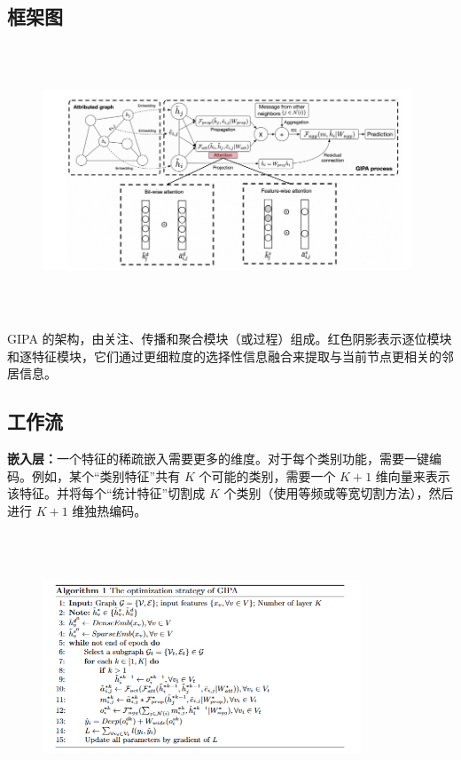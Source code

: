 \documentclass{article}
\begin{document}
\subsection*{框架图}
\begin{figure}[htbp]
    \centering
    \includegraphics[width=11cm, height=8cm]{框架图.png}
\end{figure}
GIPA 的架构，由关注、传播和聚合模块（或过程）组成。红色阴影表示逐位模块和逐特征模块，它们通过更细粒度的选择性信息融合来提取与当前节点更相关的邻居信息。

\subsection*{工作流}
\textbf{嵌入层：}一个特征的稀疏嵌入需要更多的维度。对于每个类别功能，需要一键编码。例如，某个“类别特征”共有 \(K\) 个可能的类别，需要一个 \(K + 1\) 维向量来表示该特征。并将每个“统计特征”切割成 \(K\) 个类别（使用等频或等宽切割方法），然后进行 \(K + 1\) 维独热编码。
\clearpage %
\begin{figure}[htbp]
    \centering
    \includegraphics[width=9.5cm, height=8cm]{嵌入层优化.png}
\end{figure}
\end{document}
